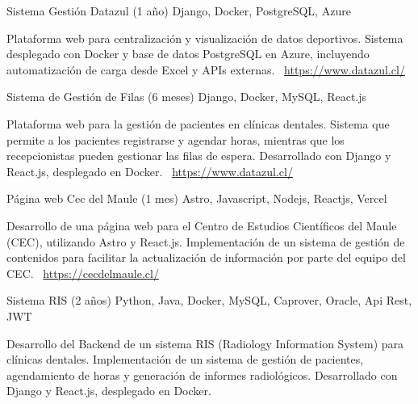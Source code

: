 \documentclass[]{awesome-cv}
\begin{document}
\begin{cventries}
	\vspace{-3mm}
	\cventry
	{}
	{Sistema Gestión Datazul (1 año) \vspace{-5mm}}
	{Django, Docker, PostgreSQL, Azure \vspace{-5mm}}
	{}
	{\begin{cvsectionnormaltext}
		\item {Plataforma web para centralización y visualización de datos deportivos. Sistema desplegado con Docker y base de datos PostgreSQL en Azure, incluyendo automatización de carga desde Excel y APIs externas.
		\newline \faLink\ \href{https://www.datazul.cl/}{https://www.datazul.cl/}}
	\end{cvsectionnormaltext}}

		\vspace{-3mm}
	\cventry
	{}
	{Sistema de Gestión de Filas (6 meses) \vspace{-5mm}}
	{Django, Docker, MySQL, React.js \vspace{-5mm}}
	{}
	{\begin{cvsectionnormaltext}
		\item {Plataforma web para la gestión de pacientes en clínicas dentales. Sistema que permite a los pacientes registrarse y agendar horas, mientras que los recepcionistas pueden gestionar las filas de espera. Desarrollado con Django y React.js, desplegado en Docker.
		\newline \faLink\ \href{https://www.datazul.cl/}{https://www.datazul.cl/}}
	\end{cvsectionnormaltext}}

	\vspace{-3mm}
	\cventry
	{}
	{Página web Cec del Maule (1 mes) \vspace{-5mm}}
	{Astro, Javascript, Nodejs, Reactjs, Vercel \vspace{-5mm}}
	{}
	{\begin{cvsectionnormaltext}
		\item {Desarrollo de una página web para el Centro de Estudios Científicos del Maule (CEC), utilizando Astro y React.js. Implementación de un sistema de gestión de contenidos para facilitar la actualización de información por parte del equipo del CEC.
		\newline \faLink\ \href{https://cecdelmaule.cl/}{https://cecdelmaule.cl/}}
	\end{cvsectionnormaltext}}

	\vspace{-3mm}
	\cventry
	{}
	{Sistema RIS (2 años) \vspace{-5mm}}
	{Python, Java, Docker, MySQL, Caprover, Oracle, Api Rest, JWT \vspace{-5mm}}
	{}
	{\begin{cvsectionnormaltext}
		\item {Desarrollo del Backend de un sistema RIS (Radiology Information System) para clínicas dentales. Implementación de un sistema de gestión de pacientes, agendamiento de horas y generación de informes radiológicos. Desarrollado con Django y React.js, desplegado en Docker.
		}
	\end{cvsectionnormaltext}}
	

\end{cventries}
\end{document}
